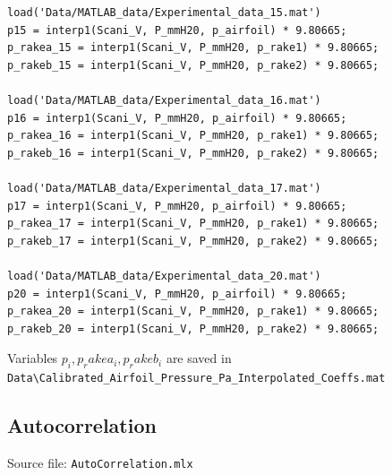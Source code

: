 \documentclass[runningheads]{llncs}
\begin{document}
\begin{verbatim}
load('Data/MATLAB_data/Experimental_data_15.mat')
p15 = interp1(Scani_V, P_mmH20, p_airfoil) * 9.80665;
p_rakea_15 = interp1(Scani_V, P_mmH20, p_rake1) * 9.80665;
p_rakeb_15 = interp1(Scani_V, P_mmH20, p_rake2) * 9.80665;

load('Data/MATLAB_data/Experimental_data_16.mat')
p16 = interp1(Scani_V, P_mmH20, p_airfoil) * 9.80665;
p_rakea_16 = interp1(Scani_V, P_mmH20, p_rake1) * 9.80665;
p_rakeb_16 = interp1(Scani_V, P_mmH20, p_rake2) * 9.80665;

load('Data/MATLAB_data/Experimental_data_17.mat')
p17 = interp1(Scani_V, P_mmH20, p_airfoil) * 9.80665;
p_rakea_17 = interp1(Scani_V, P_mmH20, p_rake1) * 9.80665;
p_rakeb_17 = interp1(Scani_V, P_mmH20, p_rake2) * 9.80665;

load('Data/MATLAB_data/Experimental_data_20.mat')
p20 = interp1(Scani_V, P_mmH20, p_airfoil) * 9.80665;
p_rakea_20 = interp1(Scani_V, P_mmH20, p_rake1) * 9.80665;
p_rakeb_20 = interp1(Scani_V, P_mmH20, p_rake2) * 9.80665;
\end{verbatim}

Variables $p_i, p_rakea_i, p_rakeb_i$ are saved in \newline 
\verb|Data\Calibrated_Airfoil_Pressure_Pa_Interpolated_Coeffs.mat|

\subsection{Autocorrelation}

Source file: \verb|AutoCorrelation.mlx|
\end{document}
